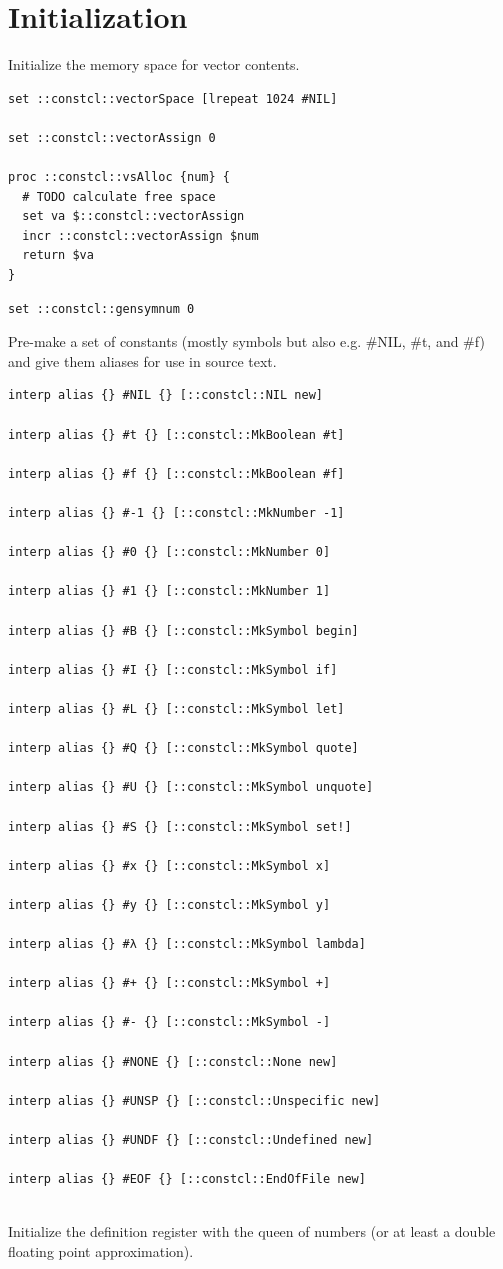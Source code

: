 \documentclass[twoside,9pt]{report}
\begin{document}
\chapter{Initialization}
\label{initialization}

Initialize the memory space for vector contents.

\noindent\makebox[\linewidth]{\rule{\linewidth}{0.4pt}}
\begin{lstlisting}
set ::constcl::vectorSpace [lrepeat 1024 #NIL]
 
set ::constcl::vectorAssign 0
 
proc ::constcl::vsAlloc {num} {
  # TODO calculate free space
  set va $::constcl::vectorAssign
  incr ::constcl::vectorAssign $num
  return $va
}
\end{lstlisting}
\noindent\makebox[\linewidth]{\rule{\linewidth}{0.4pt}}
\noindent\makebox[\linewidth]{\rule{\linewidth}{0.4pt}}
\begin{lstlisting}
set ::constcl::gensymnum 0
\end{lstlisting}
\noindent\makebox[\linewidth]{\rule{\linewidth}{0.4pt}}

Pre-make a set of constants (mostly symbols but also e.g. \#NIL, \#t, and \#f) and give them aliases for use in source text.

\noindent\makebox[\linewidth]{\rule{\linewidth}{0.4pt}}
\begin{lstlisting}
interp alias {} #NIL {} [::constcl::NIL new]
 
interp alias {} #t {} [::constcl::MkBoolean #t]
 
interp alias {} #f {} [::constcl::MkBoolean #f]
 
interp alias {} #-1 {} [::constcl::MkNumber -1]
 
interp alias {} #0 {} [::constcl::MkNumber 0]
 
interp alias {} #1 {} [::constcl::MkNumber 1]
 
interp alias {} #B {} [::constcl::MkSymbol begin]
 
interp alias {} #I {} [::constcl::MkSymbol if]
 
interp alias {} #L {} [::constcl::MkSymbol let]
 
interp alias {} #Q {} [::constcl::MkSymbol quote]
 
interp alias {} #U {} [::constcl::MkSymbol unquote]
 
interp alias {} #S {} [::constcl::MkSymbol set!]
 
interp alias {} #x {} [::constcl::MkSymbol x]
 
interp alias {} #y {} [::constcl::MkSymbol y]
 
interp alias {} #λ {} [::constcl::MkSymbol lambda]
 
interp alias {} #+ {} [::constcl::MkSymbol +]
 
interp alias {} #- {} [::constcl::MkSymbol -]
 
interp alias {} #NONE {} [::constcl::None new]
 
interp alias {} #UNSP {} [::constcl::Unspecific new]
 
interp alias {} #UNDF {} [::constcl::Undefined new]
 
interp alias {} #EOF {} [::constcl::EndOfFile new]
 
\end{lstlisting}
\noindent\makebox[\linewidth]{\rule{\linewidth}{0.4pt}}

Initialize the definition register with the queen of numbers (or at least a double floating point approximation).
\end{document}
